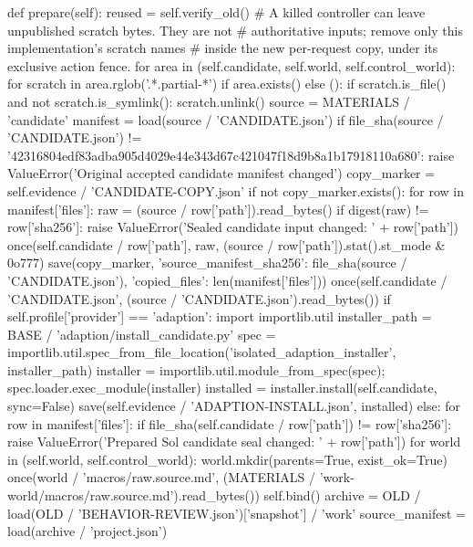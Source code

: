     def prepare(self):
        reused = self.verify_old()
        # A killed controller can leave unpublished scratch bytes. They are not
        # authoritative inputs; remove only this implementation's scratch names
        # inside the new per-request copy, under its exclusive action fence.
        for area in (self.candidate, self.world, self.control_world):
            for scratch in area.rglob('.*.partial-*') if area.exists() else ():
                if scratch.is_file() and not scratch.is_symlink():
                    scratch.unlink()
        source = MATERIALS / 'candidate'
        manifest = load(source / 'CANDIDATE.json')
        if file_sha(source / 'CANDIDATE.json') != '42316804edf83adba905d4029e44e343d67c421047f18d9b8a1b17918110a680':
            raise ValueError('Original accepted candidate manifest changed')
        copy_marker = self.evidence / 'CANDIDATE-COPY.json'
        if not copy_marker.exists():
            for row in manifest['files']:
                raw = (source / row['path']).read_bytes()
                if digest(raw) != row['sha256']:
                    raise ValueError('Sealed candidate input changed: ' + row['path'])
                once(self.candidate / row['path'], raw, (source / row['path']).stat().st_mode & 0o777)
            save(copy_marker, {'source_manifest_sha256': file_sha(source / 'CANDIDATE.json'),
                               'copied_files': len(manifest['files'])})
        once(self.candidate / 'CANDIDATE.json', (source / 'CANDIDATE.json').read_bytes())
        if self.profile['provider'] == 'adaption':
            import importlib.util
            installer_path = BASE / 'adaption/install_candidate.py'
            spec = importlib.util.spec_from_file_location('isolated_adaption_installer', installer_path)
            installer = importlib.util.module_from_spec(spec); spec.loader.exec_module(installer)
            installed = installer.install(self.candidate, sync=False)
            save(self.evidence / 'ADAPTION-INSTALL.json', installed)
        else:
            for row in manifest['files']:
                if file_sha(self.candidate / row['path']) != row['sha256']:
                    raise ValueError('Prepared Sol candidate seal changed: ' + row['path'])
        for world in (self.world, self.control_world):
            world.mkdir(parents=True, exist_ok=True)
            once(world / 'macros/raw.source.md', (MATERIALS / 'work-world/macros/raw.source.md').read_bytes())
        self.bind()
        archive = OLD / load(OLD / 'BEHAVIOR-REVIEW.json')['snapshot'] / 'work'
        source_manifest = load(archive / 'project.json')
